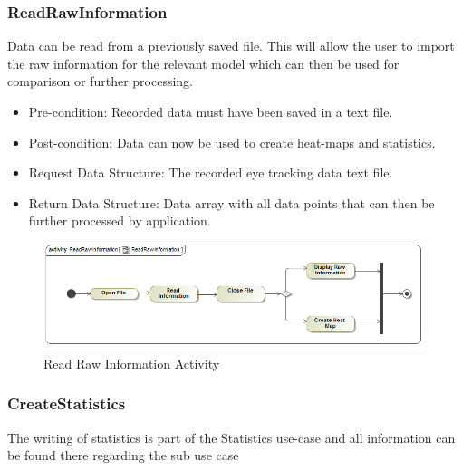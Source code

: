 	\subsubsection{ReadRawInformation}
Data can be read from a previously saved file. This will allow the user to import the raw information for the relevant model which can then be used for comparison or further processing.
\begin{itemize}
\item Pre-condition: Recorded data must have been saved in a text file.
\item Post-condition: Data can now be used to create heat-maps and statistics.
\item Request Data Structure: The recorded eye tracking data text file.
\item Return Data Structure: Data array with all data points that can then be further processed by application.
\end{itemize}

\begin{figure}[!ht]
	\centering
	\includegraphics[scale=0.5,width=15cm,keepaspectratio]{Diagrams/Activity_Diagram__ReadRawInformation__ReadRawInformation.png}
	\caption{Read Raw Information Activity}
\end{figure}
	
	\subsubsection{CreateStatistics}
The writing of statistics is part of the Statistics use-case and all information can be found there regarding the sub use case

	
	
